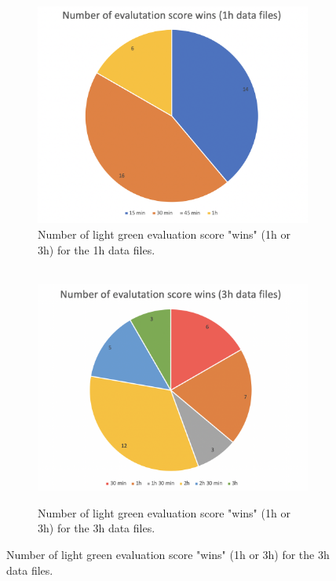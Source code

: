\begin{figure}
  \centering
  \begin{subfigure}{.475\textwidth}
    \centering
    \includegraphics[width=1.2\textwidth]{./images/clusteringResults/clusteringResultsGraph1h.png}
    \caption{Number of light green evaluation score "wins" (1h or 3h) for the 1h data files.}
    \label{figure:clusteringResultsGraph1h}
  \end{subfigure}%
  \hfill
  \begin{subfigure}{.475\textwidth}
    \centering
    \  \includegraphics[width=1.2\textwidth]{./images/clusteringResults/clusteringResultsGraph3h.png}
    \caption{Number of light green evaluation score "wins" (1h or 3h) for the 3h data files.}
    \label{figure:clusteringResultsGraph3h}
  \end{subfigure}
\end{figure}


